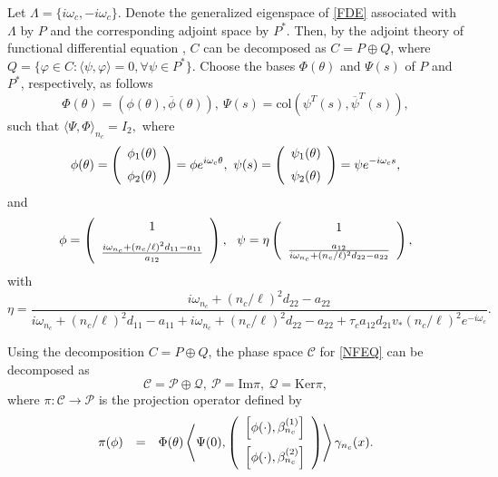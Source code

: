 \documentclass[11pt]{article}
\theoremstyle{definition}
\theoremstyle{remark}
\numberwithin{equation}{section}
\begin{document}
Let
$\Lambda=\{i\omega_c, -i\omega_c\}$. Denote the generalized eigenspace of \eqref{FDE} associated with $\Lambda$  by $P$ and  the corresponding adjoint space by
$P^*$. Then, by the adjoint theory of functional differential equation \cite{HALE-1977BOOK}, $C$ can be decomposed as
$C=P\oplus Q$, where $Q=\{\varphi\in C:
\langle\psi,\varphi\rangle=0,\forall\psi\in P^*\}$. Choose the
bases $\Phi(\theta)$ and  $\Psi(s)$ of $P$ and $P^*$, respectively, as follows
$$\Phi(\theta)=\left(\phi(\theta), \overline{\phi}(\theta)\right),
 ~\Psi(s)=\mbox{col}\left(\psi^T(s), \overline{\psi }^T(s)\right),$$
such that $\langle\Psi, \Phi\rangle_{n_c}=I_2,$
where
$$
\phi(\theta)=\left(
\begin{array}{c}
\phi_1(\theta)\vspace{0.2cm}\\
 \phi_2(\theta)
 \end{array}
\right)=\phi e^{i\omega_{c}\theta},~\psi(s)=\left(
\begin{array}{c}
\psi_1(\theta)\vspace{0.2cm}\\
 \psi_2(\theta)
 \end{array}
\right)=
\psi e^{-i\omega_{c}s},
$$
and
\begin{equation*}
\phi=\left(\begin{array}{c} 1 \vspace{0.2cm}\\
\frac{i\omega_{n_c}+(n_c/\ell)^2d_{11}-a_{11}}{a_{12}}
\end{array}\right),
~~
\psi=\eta \left(\begin{array}{c} 1 \vspace{0.2cm}\\
\frac{a_{12}}{i\omega_{n_c}+(n_c/\ell)^2d_{22}-a_{22}}
\end{array}\right),
\end{equation*}
with
$$\eta =\frac{i\omega_{n_c}+(n_c/\ell)^2d_{22}-a_{22}}{i\omega_{n_c}+(n_c/\ell)^2d_{11}-a_{11}+i\omega_{n_c}+(n_c/\ell)^2d_{22}-a_{22}+\tau_ca_{12}d_{21}v_*(n_c/\ell)^2e^{-i\omega_c}}.$$

Using the decomposition $C=P\oplus Q$,  the phase space $\mathscr{C}$ for \eqref{NFEQ}  can be decomposed as
$$ \mathscr{C}=\mathcal{P} \oplus \mathcal{Q}, ~\mathcal{P}=\mbox{Im} \pi, ~\mathcal{Q}=\mbox{Ker} \pi, $$
 where $\pi:  \mathscr{C}\rightarrow \mathcal{P}$ is the  projection operator defined by
$$
\begin{array}{lll}
  \pi (\phi)
&=&
\Phi (\theta) \left \langle  \Psi (0), \left(\begin{array}{c}\left[\phi(\cdot), \beta_{n_c}^{(1)}\right]\vspace{0.2cm}\\
\left[\phi(\cdot),   \beta_{n_c}^{(2)}\right]
\end{array}\right)  \right\rangle  \gamma_{n_c}(x).
\end{array}
$$
\end{document}
